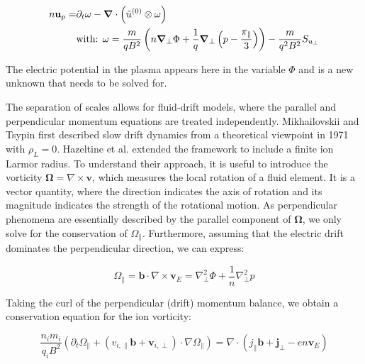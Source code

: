 \begin{align}
	n\mathbf{u}_{p} =& \partial_t\mathbf{\omega} - \grad\cdot\left(\tilde{u}^{(0)}\otimes\mathbf{\omega}\right) \nonumber \\
	&\text{with: } \mathbf{\omega} = \frac{m}{qB^2}\left(n\grad_\perp\Phi + \frac{1}{q}\grad_{\perp}\left(p-\frac{\pi_\parallel}{3}\right)\right) - \frac{m}{q^2B^2}S_{u_\perp} \label{eq:definitionSmallOmega}
\end{align}

The electric potential in the plasma appears here in the variable $\Phi$ and is a new unknown that needs to be solved for.






The separation of scales allows for fluid-drift models, where the parallel and perpendicular momentum equations are treated independently. Mikhailovskii and Tsypin\cite{mikhailovskii1971transport} first described slow drift dynamics from a theoretical viewpoint in 1971 with $\rho_L = 0$. Hazeltine et al.\cite{hazeltine1985four} extended the framework to include a finite ion Larmor radius. To understand their approach, it is useful to introduce the vorticity $ \boldsymbol{\Omega} = \nabla \times \mathbf{v}$, which measures the local rotation of a fluid element. It is a vector quantity, where the direction indicates the axis of rotation and its magnitude indicates the strength of the rotational motion. As perpendicular phenomena are essentially described by the parallel component of $\boldsymbol{\Omega}$, we only solve for the conservation of $\Omega_\parallel$. Furthermore, assuming that the electric drift dominates the perpendicular direction, we can express:

\begin{equation}
	\Omega_\parallel = \mathbf{b} \cdot \nabla \times \mathbf{v}_E = \nabla_\perp^2 \Phi + \frac{1}{n}\nabla_\perp^2 p
\end{equation}

Taking the curl of the perpendicular (drift) momentum balance, we obtain a conservation equation for the ion vorticity:

\begin{equation}
	\label{eq:edge_vorticityConservation}
	\frac{n_im_i}{q_iB^2}\left(\partial_t\Omega_\parallel + (v_{i,\parallel}\mathbf{b} + \mathbf{v}_{i,\perp})\cdot\nabla\Omega_\parallel\right) = \nabla \cdot \left(j_\parallel\mathbf{b} + \mathbf{j}_\perp - en\mathbf{v}_E\right)
\end{equation}


